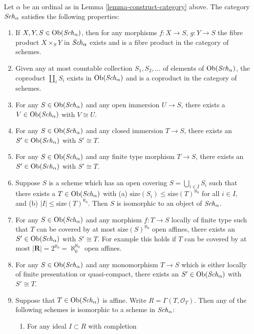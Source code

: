 \begin{lemma}
\label{lemma-what-is-in-it}
Let $\alpha$ be an ordinal as in Lemma \ref{lemma-construct-category} above.
The category $\mathit{Sch}_\alpha$ satisfies the following
properties:
\begin{enumerate}
\item If $X, Y, S \in \mathop{\mathrm{Ob}}\nolimits(\mathit{Sch}_\alpha)$, then
for any morphisms $f : X \to S$, $g : Y \to S$ the fibre
product $X \times_S Y$ in $\mathit{Sch}_\alpha$ exists
and is a fibre product in the category of schemes.
\item Given any at most countable collection $S_1, S_2, \ldots$
of elements of $\mathop{\mathrm{Ob}}\nolimits(\mathit{Sch}_\alpha)$, the coproduct
$\coprod_i S_i$ exists in $\mathop{\mathrm{Ob}}\nolimits(\mathit{Sch}_\alpha)$ and
is a coproduct in the category of schemes.
\item For any $S \in \mathop{\mathrm{Ob}}\nolimits(\mathit{Sch}_\alpha)$ and
any open immersion $U \to S$, there exists a
$V \in \mathop{\mathrm{Ob}}\nolimits(\mathit{Sch}_\alpha)$ with $V \cong U$.
\item For any $S \in \mathop{\mathrm{Ob}}\nolimits(\mathit{Sch}_\alpha)$ and
any closed immersion $T \to S$, there exists an
$S' \in \mathop{\mathrm{Ob}}\nolimits(\mathit{Sch}_\alpha)$ with $S' \cong T$.
\item For any $S \in \mathop{\mathrm{Ob}}\nolimits(\mathit{Sch}_\alpha)$ and
any finite type morphism $T \to S$, there exists an
$S' \in \mathop{\mathrm{Ob}}\nolimits(\mathit{Sch}_\alpha)$ with $S' \cong T$.
\item Suppose $S$ is a scheme which has an open covering
$S = \bigcup_{i \in I} S_i$ such that there exists
a $T \in \mathop{\mathrm{Ob}}\nolimits(\mathit{Sch}_\alpha)$ with
(a) $\text{size}(S_i) \leq \text{size}(T)^{\aleph_0}$ for all
$i \in I$, and (b) $|I| \leq \text{size}(T)^{\aleph_0}$.
Then $S$ is isomorphic to an object of $\mathit{Sch}_\alpha$.
\item For any $S \in \mathop{\mathrm{Ob}}\nolimits(\mathit{Sch}_\alpha)$ and
any morphism $f : T \to S$ locally of finite type such
that $T$ can be covered by at most
$\text{size}(S)^{\aleph_0}$ open affines, there exists an
$S' \in \mathop{\mathrm{Ob}}\nolimits(\mathit{Sch}_\alpha)$ with $S' \cong T$.
For example this holds if $T$ can be covered by at most
$|\mathbf{R}| = 2^{\aleph_0} = \aleph_0^{\aleph_0}$ open affines.
\item For any $S \in \mathop{\mathrm{Ob}}\nolimits(\mathit{Sch}_\alpha)$ and
any monomorphism $T \to S$ which is either locally of finite presentation
or quasi-compact, there exists an
$S' \in \mathop{\mathrm{Ob}}\nolimits(\mathit{Sch}_\alpha)$ with $S' \cong T$.
\item Suppose that $T \in \mathop{\mathrm{Ob}}\nolimits(\mathit{Sch}_\alpha)$ is
affine. Write $R = \Gamma(T, \mathcal{O}_T)$.
Then any of the following schemes is isomorphic to a scheme
in $\mathit{Sch}_\alpha$:
\begin{enumerate}
\item For any ideal $I \subset R$ with completion

\end{enumerate}
\end{enumerate}
\end{lemma}
